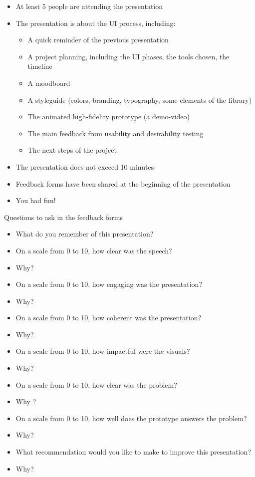 \begin{itemize}
\item At least 5 people are attending the presentation
\item The presentation is about the UI process, including:
\begin{itemize}
\item A quick reminder of the previous presentation
\item A project planning, including the UI phases, the tools chosen, the timeline
\item A moodboard
\item A styleguide (colors, branding, typography, some elements of the library)
\item The animated high-fidelity prototype (a demo-video)
\item The main feedback from usability and desirability testing
\item The next steps of the project
\end{itemize}
\item The presentation does not exceed 10 minutes
\item Feedback forms have been shared at the beginning of the presentation
\item You had fun!
\end{itemize}

Questions to ask in the feedback forms

\begin{itemize}
\item What do you remember of this presentation?
\item On a scale from 0 to 10, how clear was the speech?
\item Why?
\item On a scale from 0 to 10, how engaging was the presentation?
\item Why?
\item On a scale from 0 to 10, how coherent was the presentation?
\item Why?
\item On a scale from 0 to 10, how impactful were the visuals?
\item Why?
\item On a scale from 0 to 10, how clear was the problem?
\item Why ?
\item On a scale from 0 to 10, how well does the prototype answers the problem?
\item Why?
\item What recommendation would you like to make to improve this presentation?
\item Why?
\end{itemize}

